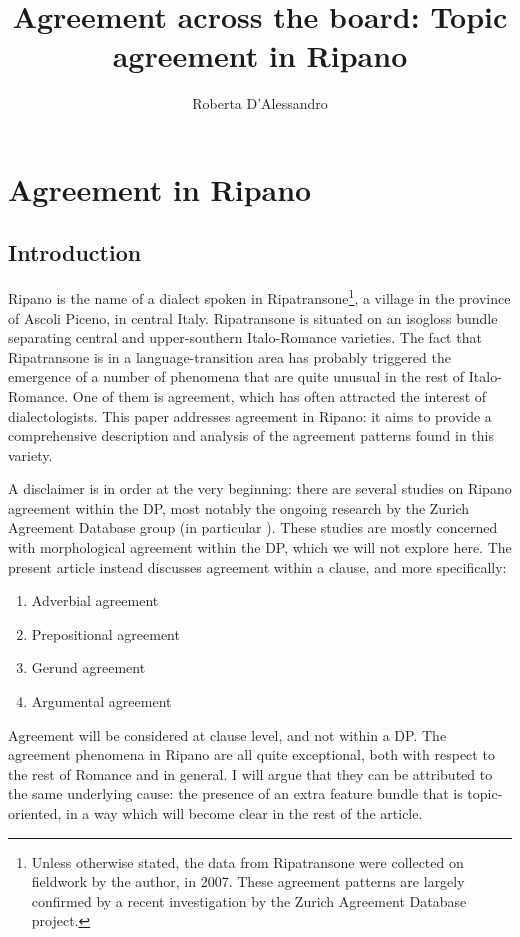 \documentclass[output=paper
,modfonts
,nonflat]{langsci/langscibook}
\title{Agreement across the board:\newlineCover{} Topic agreement in Ripano}
\author{Roberta D'Alessandro\affiliation{Utrecht University}}
\begin{document}
\maketitle 

\section{Agreement in Ripano}  \label{sec-dalessandro:1} 
\subsection{Introduction}\label{sec-dalessandro:1.1}
Ripano is the name of a dialect spoken in Ripatransone\footnote{Unless otherwise stated, the data from Ripatransone were collected on fieldwork by the author, in 2007. These agreement patterns are largely confirmed by a recent investigation by the Zurich Agreement Database project.}, a village in the province of Ascoli Piceno, in central Italy. Ripatransone is situated on an isogloss bundle separating central and upper-southern Italo-Romance varieties. The fact that Ripatransone is in a language-transition area has probably triggered the emergence of a number of phenomena that are quite unusual in the rest of Italo-Romance. One of them is agreement, which has often attracted the interest of dialectologists. This paper addresses agreement in Ripano: it aims to provide a comprehensive description and analysis of the agreement patterns found in this variety.

A disclaimer is in order at the very beginning: there are several studies on Ripano agreement within the DP, most notably the ongoing research by the Zurich Agreement Database group (in particular \citealt{Paciaroni_Loporcaro2018}). These studies are mostly concerned with morphological agreement within the DP, which we will not explore here. The present article instead discusses agreement within a clause, and more specifically:

\begin{enumerate}[label=\alph*.]
\item Adverbial agreement
\item Prepositional agreement
\item Gerund agreement
\item Argumental agreement
\end{enumerate}

\noindent Agreement will be considered at clause level, and not within a DP. The agreement phenomena in Ripano are all quite exceptional, both with respect to the rest of Romance and in general. I will argue that they can be attributed to the same underlying cause: the presence of an extra feature bundle that is topic-oriented, in a way which will become clear in the rest of the article.
\end{document}
